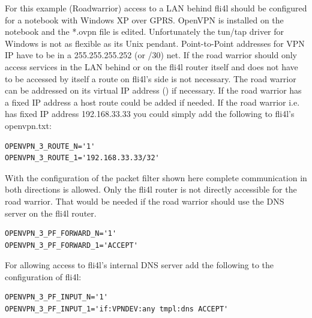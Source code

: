 For this example (Roadwarrior) access to a LAN 
behind fli4l should be configured for a notebook with Windows XP over GPRS. 
OpenVPN is installed on the notebook and the *.ovpn file is edited.  
Unfortunately the tun/tap driver for Windows is not as flexible as its 
Unix pendant. Point-to-Point addresses for VPN IP have to be in a 
255.255.255.252 (or /30) net. If the road warrior should only access 
services in the LAN behind or on the fli4l router itself and does not 
have to be accessed by itself a route on fli4l's side is not necessary. 
The road warrior can be addressed on its virtual IP address 
() if necessary. If the road warrior 
has a fixed IP address a host route could be added if needed. If the 
road warrior i.e. has fixed IP address 192.168.33.33 you could simply 
add the following to fli4l's openvpn.txt:

\begin{example}
\begin{verbatim}
OPENVPN_3_ROUTE_N='1'
OPENVPN_3_ROUTE_1='192.168.33.33/32'
\end{verbatim}
\end{example}

With the configuration of the packet filter shown here complete 
communication in both directions is allowed. Only the fli4l router 
is not directly accessible for the road warrior. That would be 
needed if the road warrior should use the DNS server on the fli4l 
router.

\begin{example}
\begin{verbatim}
OPENVPN_3_PF_FORWARD_N='1'
OPENVPN_3_PF_FORWARD_1='ACCEPT'
\end{verbatim}
\end{example}

For allowing access to fli4l's internal DNS server add the 
following to the configuration of fli4l:

\begin{example}
\begin{verbatim}
OPENVPN_3_PF_INPUT_N='1'
OPENVPN_3_PF_INPUT_1='if:VPNDEV:any tmpl:dns ACCEPT'
\end{verbatim}
\end{example}

